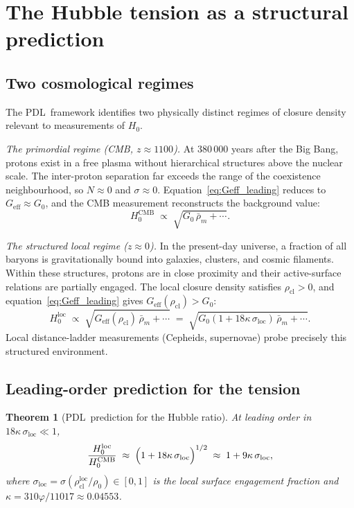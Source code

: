 \documentclass[11pt,a4paper]{article}
\newtheorem{theorem}{Theorem}[section]
\theoremstyle{definition}
\newcommand{\PDL}{\textnormal{PDL}}
\newcommand{\Geff}{G_{\mathrm{eff}}}
\newcommand{\Gzero}{G_0}
\newcommand{\vp}{\varphi}
\newcommand{\kap}{\kappa}
\newcommand{\sig}{\sigma}
\newcommand{\rhocl}{\rho_{\mathrm{cl}}}
\newcommand{\rhoO}{\rho_0}
\newcommand{\Hzero}{H_0}
\newcommand{\HCMB}{H_0^{\mathrm{CMB}}}
\newcommand{\Hloc}{H_0^{\mathrm{loc}}}
\begin{document}
\section{The Hubble tension as a structural prediction}
\label{sec:hubble}

\subsection{Two cosmological regimes}
\label{subsec:two_regimes}

The \PDL\ framework identifies two physically distinct regimes of closure density relevant to measurements of $\Hzero$.

\medskip\noindent\emph{The primordial regime (CMB, $z \approx 1100$).} At 380\,000 years after the Big Bang, protons exist in a free plasma without hierarchical structures above the nuclear scale. The inter-proton separation far exceeds the range of the coexistence neighbourhood, so $N \approx 0$ and $\sig \approx 0$. Equation~\eqref{eq:Geff_leading} reduces to $\Geff \approx \Gzero$, and the CMB measurement reconstructs the background value:
\begin{equation}
  \label{eq:HCMB_PDL}
  \HCMB \;\propto\; \sqrt{\Gzero\,\bar\rho_m + \cdots}.
\end{equation}

\medskip\noindent\emph{The structured local regime ($z \approx 0$).} In the present-day universe, a fraction of all baryons is gravitationally bound into galaxies, clusters, and cosmic filaments. Within these structures, protons are in close proximity and their active-surface relations are partially engaged. The local closure density satisfies $\rhocl > 0$, and equation~\eqref{eq:Geff_leading} gives $\Geff(\rhocl) > \Gzero$:
\begin{equation}
  \label{eq:Hloc_PDL}
  \Hloc \;\propto\; \sqrt{\Geff(\rhocl)\,\bar\rho_m + \cdots} \;=\; \sqrt{\Gzero(1 + 18\kap\,\sig_{\mathrm{loc}})\,\bar\rho_m + \cdots}.
\end{equation}
Local distance-ladder measurements (Cepheids, supernovae) probe precisely this structured environment.

\subsection{Leading-order prediction for the tension}
\label{subsec:tension_formula}

\begin{theorem}[\PDL\ prediction for the Hubble ratio]
\label{thm:hubble_ratio}
At leading order in $18\kap\,\sig_{\mathrm{loc}} \ll 1$,
\begin{equation}
  \label{eq:H_ratio}
  \frac{\Hloc}{\HCMB} \;\approx\; \Bigl(1 + 18\kap\,\sig_{\mathrm{loc}}\Bigr)^{1/2} \;\approx\; 1 + 9\kap\,\sig_{\mathrm{loc}},
\end{equation}
where $\sig_{\mathrm{loc}} = \sig(\rhocl^{\mathrm{loc}}/\rhoO) \in [0,1]$ is the local surface engagement fraction and $\kap = 310\vp/11017 \approx 0.04553$.
\end{theorem}
\end{document}
